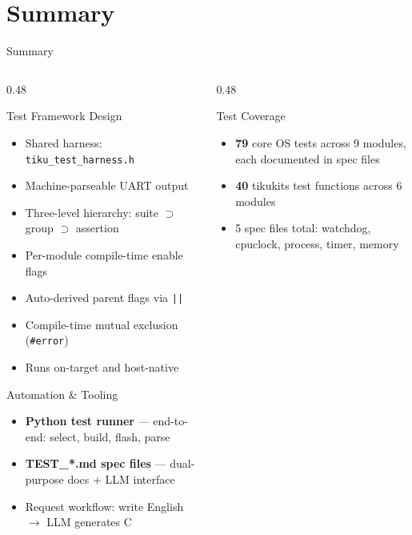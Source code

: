 \documentclass[aspectratio=169, 10pt]{beamer}
\begin{document}
\section{Summary}

\begin{frame}{Summary}
\begin{columns}[T]
\begin{column}{0.48\textwidth}
\begin{block}{Test Framework Design}
\begin{itemize}
  \item Shared harness: \texttt{tiku\_test\_harness.h}
  \item Machine-parseable UART output
  \item Three-level hierarchy: suite $\supset$ group $\supset$ assertion
  \item Per-module compile-time enable flags
  \item Auto-derived parent flags via \texttt{||}
  \item Compile-time mutual exclusion (\texttt{\#error})
  \item Runs on-target and host-native
\end{itemize}
\end{block}

\vspace{0.3em}
\begin{block}{Automation \& Tooling}
\begin{itemize}
  \item \textbf{Python test runner} --- end-to-end: select, build, flash, parse
  \item \textbf{TEST\_*.md spec files} --- dual-purpose docs + LLM interface
  \item Request workflow: write English $\rightarrow$ LLM generates C
\end{itemize}
\end{block}
\end{column}

\begin{column}{0.48\textwidth}
\begin{block}{Test Coverage}
\begin{itemize}
  \item \textbf{79} core OS tests across 9 modules, each documented in spec files
  \item \textbf{40} tikukits test functions across 6 modules
  \item 5 spec files total: watchdog, cpuclock, process, timer, memory
\end{itemize}
\end{block}


\end{column}
\end{columns}
\end{frame}
\end{document}
